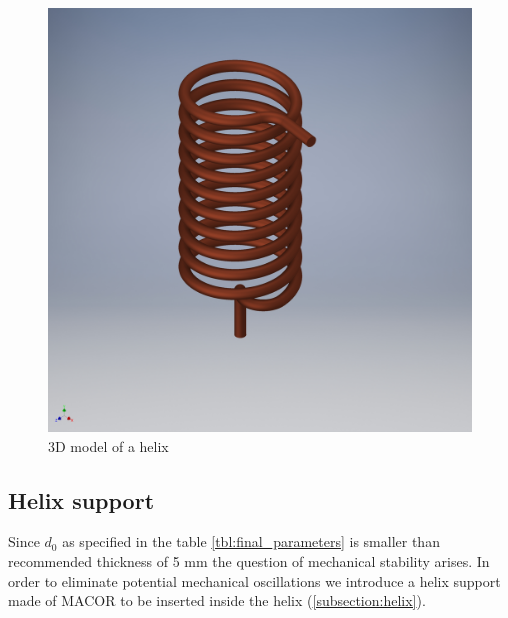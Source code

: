 \begin{figure}[h]
	\centering
	\includegraphics[width=\textwidth]{images/coil}
	\caption{3D model of a helix}
	\label{fig:helix}
\end{figure}

\clearpage
\subsection{Helix support}
\label{subsection:helix_support}
Since $d_0$ as specified in the table \ref{tbl:final_parameters} is smaller than recommended thickness of 5 mm the question of mechanical stability arises. In order to eliminate potential mechanical oscillations we introduce a helix support made of MACOR to be inserted inside the helix (\ref{subsection:helix}).

